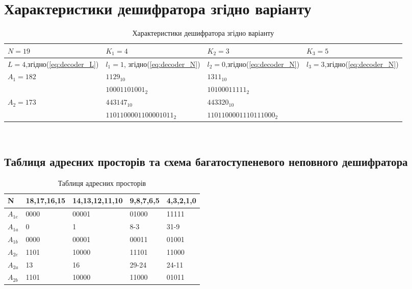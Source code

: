 \section{Характеристики дешифратора згідно варіанту}
\begin{center}
\begin{table}[h!]
\begin{tabu}{ | X[-3,l] | X[6,l] | X[6,l] | X[-3,l]|}
\hline
$N=19$ & $K_{1}=4$ & $K_{2}=3$  & $K_{3}=5$ \\
\hline
$L=4$,\newline згідно(\ref{eq:decoder_L}) & $l_{1}=1$, \newline згідно(\ref{eq:decoder_N}) & $l_{2}=0$,\newline згідно(\ref{eq:decoder_N}) & $l_{3}=3$,\newline згідно(\ref{eq:decoder_N}) \\
\hline
$A_{1}=182$ & $1129_{10}$ & $1311_{10}$ &  \\
\hline
& $10001101001_{2}$ & $10100011111_{2}$ &  \\
\hline
$A_{2}=173$ & $443147_{10}$ & $443320_{10}$ &   \\
\hline
& $1101100001100001011_{2}$ & $1101100001110111000_{2}$ &  \\
\hline
\end{tabu}
\vspace{6mm}\\
\caption{Характеристики дешифратора згідно варіанту}\label{tab:decoder_spec}
\end{table}
\end{center}
\subsection{Таблиця адресних просторів та схема багатоступеневого неповного дешифратора}
\begin{center}
\begin{table}[h!]
\begin{tabu}{ | X[-3,l] | X[-3,l] | X[-3,l] | X[-3,l] |X[-3,l] |}
\hline
N & 18,17,16,15 & 14,13,12,11,10 & 9,8,7,6,5 & 4,3,2,1,0 \\
 \hline
$A_{1e}$ & 0000 & 00001 & 01000 & 11111  \\
\hline
$A_{1a}$ &  0 & 1  &  8-3 & 31-9  \\
\hline
$A_{1b}$ & 0000 & 00001 & 00011 & 01001   \\
\hline
$A_{2e}$ & 1101 & 10000 & 11101 & 11000  \\
\hline
$A_{2a}$ & 13 & 16 & 29-24 & 24-11  \\
\hline
$A_{2b}$ & 1101 & 10000 & 11000 & 01011  \\
\hline
\end{tabu}
\vspace{6mm}\\
\caption{Таблиця адресних просторів}\label{tab:decoder_addr}
\end{table}
\end{center}
%
\newpage

